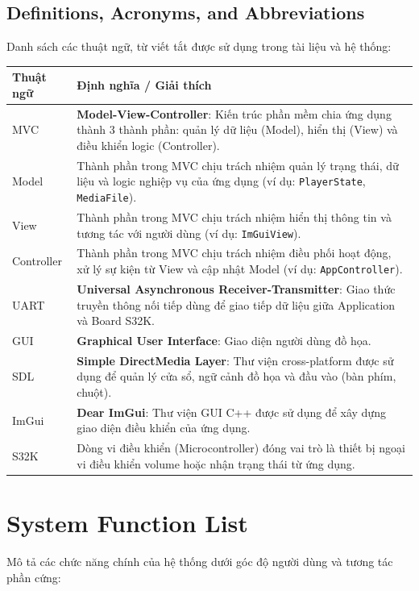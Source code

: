 \documentclass{article}
\begin{document}
\subsection{Definitions, Acronyms, and Abbreviations}
Danh sách các thuật ngữ, từ viết tắt được sử dụng trong tài liệu và hệ thống:

\begin{center}
\renewcommand{\arraystretch}{1.5}
\begin{tabular}{|l|p{12cm}|}
\hline
\textbf{Thuật ngữ} & \textbf{Định nghĩa / Giải thích} \\ \hline
MVC & \textbf{Model-View-Controller}: Kiến trúc phần mềm chia ứng dụng thành 3 thành phần: quản lý dữ liệu (Model), hiển thị (View) và điều khiển logic (Controller). \\ \hline
Model & Thành phần trong MVC chịu trách nhiệm quản lý trạng thái, dữ liệu và logic nghiệp vụ của ứng dụng (ví dụ: \texttt{PlayerState}, \texttt{MediaFile}). \\ \hline
View & Thành phần trong MVC chịu trách nhiệm hiển thị thông tin và tương tác với người dùng (ví dụ: \texttt{ImGuiView}). \\ \hline
Controller & Thành phần trong MVC chịu trách nhiệm điều phối hoạt động, xử lý sự kiện từ View và cập nhật Model (ví dụ: \texttt{AppController}). \\ \hline
UART & \textbf{Universal Asynchronous Receiver-Transmitter}: Giao thức truyền thông nối tiếp dùng để giao tiếp dữ liệu giữa Application và Board S32K. \\ \hline
GUI & \textbf{Graphical User Interface}: Giao diện người dùng đồ họa. \\ \hline
SDL & \textbf{Simple DirectMedia Layer}: Thư viện cross-platform được sử dụng để quản lý cửa sổ, ngữ cảnh đồ họa và đầu vào (bàn phím, chuột). \\ \hline
ImGui & \textbf{Dear ImGui}: Thư viện GUI C++ được sử dụng để xây dựng giao diện điều khiển của ứng dụng. \\ \hline
S32K & Dòng vi điều khiển (Microcontroller) đóng vai trò là thiết bị ngoại vi điều khiển volume hoặc nhận trạng thái từ ứng dụng. \\ \hline
\end{tabular}
\end{center}

\section{System Function List}
Mô tả các chức năng chính của hệ thống dưới góc độ người dùng và tương tác phần cứng:
\end{document}
